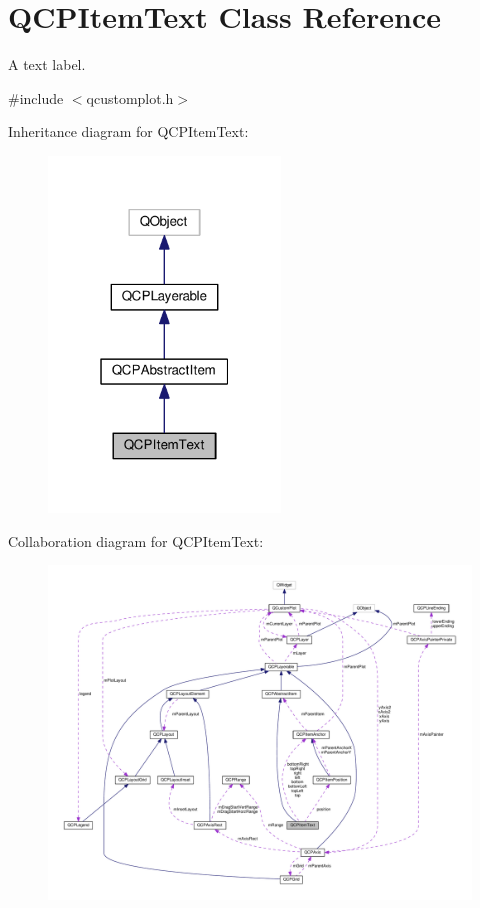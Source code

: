 \hypertarget{classQCPItemText}{}\section{Q\+C\+P\+Item\+Text Class Reference}
\label{classQCPItemText}


A text label.  




{\ttfamily \#include $<$qcustomplot.\+h$>$}



Inheritance diagram for Q\+C\+P\+Item\+Text\+:
\nopagebreak
\begin{figure}[H]
\begin{center}
\leavevmode
\includegraphics[width=175pt]{classQCPItemText__inherit__graph}
\end{center}
\end{figure}


Collaboration diagram for Q\+C\+P\+Item\+Text\+:
\nopagebreak
\begin{figure}[H]
\begin{center}
\leavevmode
\includegraphics[width=350pt]{classQCPItemText__coll__graph}
\end{center}
\end{figure}
